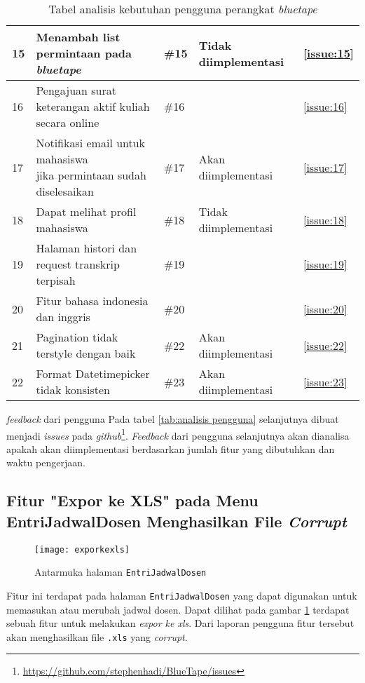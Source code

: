 \begin{table}[H]
{\begin{tabular}{|l|l|l|l|l|}
	15 & Menambah list permintaan pada \textit{bluetape} & \#15 & Tidak diimplementasi & \ref{issue:15} \\ \hline
	16 & Pengajuan surat keterangan aktif kuliah secara online & \#16 & & \ref{issue:16} \\ \hline
	17 & \makecell[l]{Notifikasi email untuk mahasiswa \\ jika permintaan sudah diselesaikan} & \#17 & Akan diimplementasi &  \ref{issue:17}\\ \hline
	18 & Dapat melihat profil mahasiswa & \#18 & Tidak diimplementasi & \ref{issue:18}\\ \hline
	19 & Halaman histori dan request transkrip terpisah & \#19 & & \ref{issue:19}\\ \hline
	20 & Fitur bahasa indonesia dan inggris & \#20 & & \ref{issue:20} \\ \hline
	21 & Pagination tidak terstyle dengan baik & \#22 & Akan diimplementasi & \ref{issue:22}\\ \hline
	22 & Format Datetimepicker tidak konsisten &\#23 & Akan diimplementasi & \ref{issue:23}\\ \hline
	
	
	\end{tabular}}
	\caption{Tabel analisis kebutuhan pengguna perangkat \textit{bluetape}}
\end{table}


\textit{feedback} dari pengguna Pada tabel \ref{tab:analisis pengguna} selanjutnya dibuat menjadi \textit{issues} pada \textit{github}\footnote{\url{https://github.com/stephenhadi/BlueTape/issues}}. \textit{Feedback} dari pengguna selanjutnya akan dianalisa apakah akan diimplementasi berdasarkan jumlah fitur yang dibutuhkan dan waktu pengerjaan.


\subsection{Fitur "Expor ke XLS" pada Menu EntriJadwalDosen Menghasilkan File  \textit{Corrupt}}
\label{issue:1}
\begin{figure}[H]
	\centering
	\texttt{[image: exporkexls]} 
	\caption{Antarmuka halaman \texttt{EntriJadwalDosen}}
	\label{fig:EntriJadwalDosen} 
\end{figure}

Fitur ini terdapat pada halaman \texttt{EntriJadwalDosen} yang dapat digunakan untuk memasukan atau merubah jadwal dosen. Dapat dilihat pada gambar \ref{fig:EntriJadwalDosen} terdapat sebuah fitur untuk melakukan \textit{expor ke xls}. Dari laporan pengguna fitur tersebut akan menghasilkan file \texttt{.xls} yang \textit{corrupt}. 

